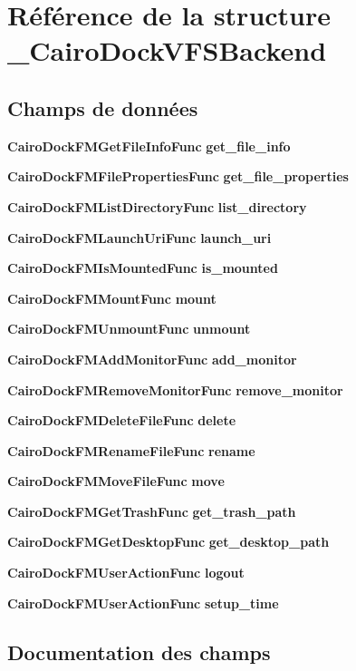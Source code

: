 \section{Référence de la structure \_\-CairoDockVFSBackend}
\label{struct__CairoDockVFSBackend}
\subsection*{Champs de données}
\begin{CompactItemize}
\item 
{\bf CairoDockFMGetFileInfoFunc} {\bf get\_\-file\_\-info}
\item 
{\bf CairoDockFMFilePropertiesFunc} {\bf get\_\-file\_\-properties}
\item 
{\bf CairoDockFMListDirectoryFunc} {\bf list\_\-directory}
\item 
{\bf CairoDockFMLaunchUriFunc} {\bf launch\_\-uri}
\item 
{\bf CairoDockFMIsMountedFunc} {\bf is\_\-mounted}
\item 
{\bf CairoDockFMMountFunc} {\bf mount}
\item 
{\bf CairoDockFMUnmountFunc} {\bf unmount}
\item 
{\bf CairoDockFMAddMonitorFunc} {\bf add\_\-monitor}
\item 
{\bf CairoDockFMRemoveMonitorFunc} {\bf remove\_\-monitor}
\item 
{\bf CairoDockFMDeleteFileFunc} {\bf delete}
\item 
{\bf CairoDockFMRenameFileFunc} {\bf rename}
\item 
{\bf CairoDockFMMoveFileFunc} {\bf move}
\item 
{\bf CairoDockFMGetTrashFunc} {\bf get\_\-trash\_\-path}
\item 
{\bf CairoDockFMGetDesktopFunc} {\bf get\_\-desktop\_\-path}
\item 
{\bf CairoDockFMUserActionFunc} {\bf logout}
\item 
{\bf CairoDockFMUserActionFunc} {\bf setup\_\-time}
\end{CompactItemize}


\subsection{Documentation des champs}
